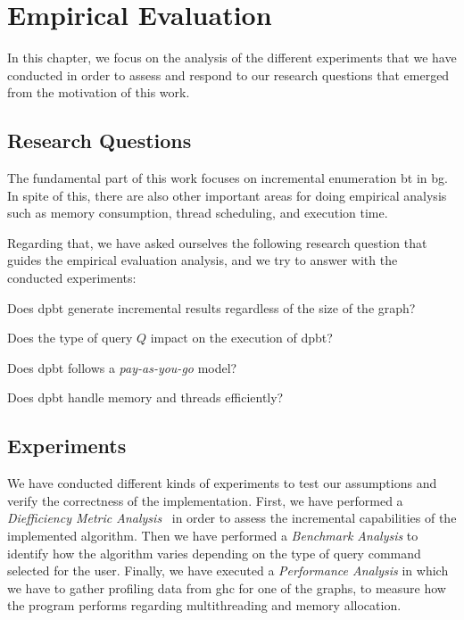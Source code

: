 \chapter{Empirical Evaluation}\label{experiments}
In this chapter, we focus on the analysis of the different experiments that we have conducted
in order to assess and respond to our research questions that emerged from the motivation of this work. 

\section{Research Questions}
The fundamental part of this work focuses on incremental enumeration \acrshort{bt} in \acrshort{bg}. 
In spite of this, there are also other important areas for doing empirical analysis such as memory consumption, thread scheduling, and execution time.

Regarding that, we have asked ourselves the following research question that guides the empirical evaluation analysis, and we try to answer with the conducted experiments:
\begin{inparaenum}[\bf {\bf RQ}1\upshape)]
\label{res:bt:question}
    \item Does \acrshort{dpbt} generate incremental results regardless of the size of the graph?
    \item Does the type of query $Q$ impact on the execution of \acrshort{dpbt}?
    \item Does \acrshort{dpbt} follows a \emph{pay-as-you-go} model?
    \item Does \acrshort{dpbt} handle memory and threads efficiently?
\end{inparaenum}
  
\section{Experiments}
We have conducted different kinds of experiments to test our assumptions and verify the correctness of the implementation.
First, we have performed a \emph{Diefficiency Metric Analysis}~\cite{diefpaper} in order to assess the incremental capabilities of the implemented algorithm. 
Then we have performed a \emph{Benchmark Analysis} to identify how the algorithm varies depending on the type of query command selected for the user.
Finally, we have executed a \textit{Performance Analysis} in which we have to gather profiling data from \acrfull{ghc} for one of the graphs, 
to measure how the program performs regarding multithreading and memory allocation.

